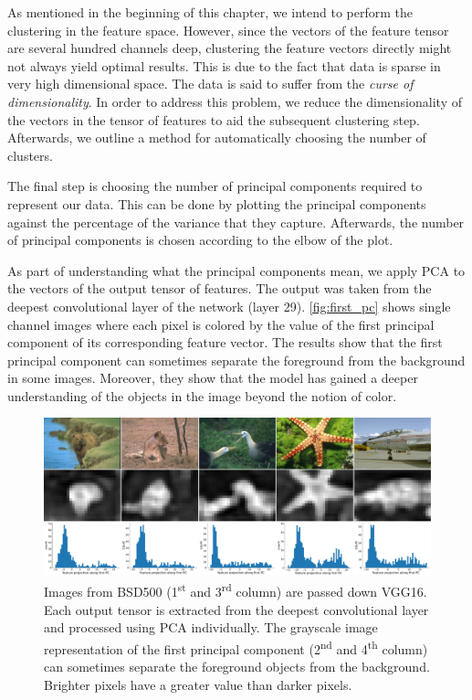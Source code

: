 
As mentioned in the beginning of this chapter, we intend to perform the clustering in the feature space. However, since the vectors of the feature tensor are several hundred channels deep, clustering the feature vectors directly might not always yield optimal results. This is due to the fact that data is sparse in very high dimensional space. The data is said to suffer from the \emph{curse of dimensionality}. In order to address this problem, we reduce the dimensionality of the vectors in the tensor of features to aid the subsequent clustering step. Afterwards, we outline a method for automatically choosing the number of clusters.

The final step is choosing the number of principal components required to represent our data. This can be done by plotting the principal components against the percentage of the variance that they capture. Afterwards, the number of principal components is chosen according to the elbow of the plot.

As part of understanding what the principal components mean, we apply PCA to the vectors of the output tensor of features. The output was taken from the deepest convolutional layer of the network (layer 29). \autoref{fig:first_pc} shows single channel images where each pixel is colored by the value of the first principal component of its corresponding feature vector. The results show that the first principal component can sometimes separate the foreground from the background in some images. Moreover, they show that the model has gained a deeper understanding of the objects in the image beyond the notion of color.

\begin{figure}[!ht]
    \centering
    \includegraphics[width=\linewidth]{figures/first_pc.pdf}
    \caption{Images from BSD500 \parencite{bsd500} (1\textsuperscript{st} and 3\textsuperscript{rd} column) are passed down VGG16. Each output tensor is extracted from the deepest convolutional layer and processed using PCA individually. The grayscale image representation of the first principal component (2\textsuperscript{nd} and 4\textsuperscript{th} column) can sometimes separate the foreground objects from the background. Brighter pixels have a greater value than darker pixels.}
    \label{fig:first_pc}
\end{figure}

